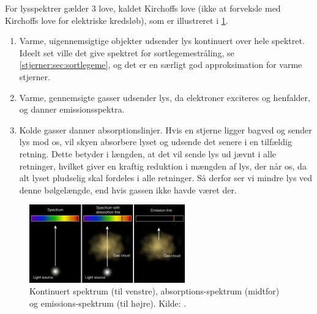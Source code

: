 \documentclass[crop=false, class=memoir]{standalone}
\begin{document}
For lysspektrer gælder 3 love, kaldet Kirchoffs love (ikke at forveksle med Kirchoffs love for elektriske kredsløb), som er illustreret i \cref{stjerner:fig:kirchoff}.
\begin{enumerate}
\item Varme, uigennemsigtige objekter udsender lys kontinuert over hele spektret. Ideelt set ville det give spektret for sortlegemestråling, se \cref{stjerner:sec:sortlegeme}, og det er en særligt god approksimation for varme stjerner. %
\item Varme, gennemsigte gasser udsender lys, da elektroner exciteres og henfalder, og danner emissionsspektra.
\item Kolde gasser danner absorptionslinjer. Hvis en stjerne ligger bagved og sender lys mod os, vil skyen absorbere lyset og udsende det senere i en tilfældig retning. Dette betyder i længden, at det vil sende lys ud jævnt i alle retninger, hvilket giver en kraftig reduktion i mængden af lys, der når os, da alt lyset pludselig skal fordeles i alle retninger. Så derfor ser vi mindre lys ved denne bølgelængde, end hvis gassen ikke havde været der.
\end{enumerate}

\begin{figure}[H]
	\centering
	\includegraphics[width=0.6\textwidth]{fig/kirchoffslaws.jpg}
	\caption{Kontinuert spektrum (til venstre), absorptions-spektrum (midtfor) og emissions-spektrum (til højre). Kilde: \cite{AbsorptionEmissionSpectra}.}
	\label{stjerner:fig:kirchoff}
\end{figure}
\end{document}
